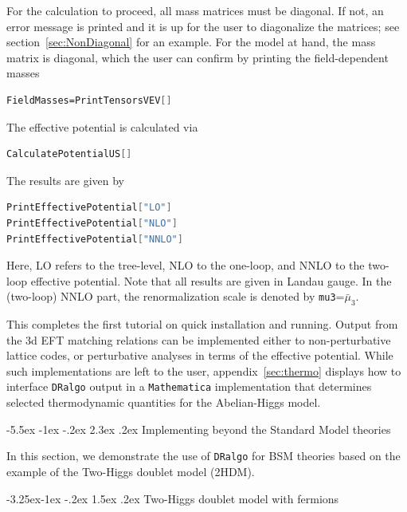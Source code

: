 \documentclass[11pt]{article}
\makeatletter
\def\dralgo{{\tt DRalgo}}
\newcommand{\Lamd}{\bmu_{3}}
\newcommand{\bmu}{\bar\mu}
\renewcommand\section{\@startsection{section}{1}{\z@}%
  {-5.5ex \@plus -1ex \@minus -.2ex}%
  {2.3ex \@plus.2ex}%
  {\normalfont\large\bfseries}}
\renewcommand\subsection{\@startsection{subsection}{2}{\z@}%
  {-3.25ex\@plus -1ex \@minus -.2ex}%
  {1.5ex \@plus .2ex}%
  {\normalfont\normalsize\bfseries}}
\makeatother
\begin{document}
For the calculation to proceed,
all mass matrices must be diagonal.
If not, an error message is printed and it is up for the user
to diagonalize the matrices;
see section~\ref{sec:NonDiagonal} for an example.
For the model at hand,
the mass matrix is diagonal,
which the user can confirm by printing the field-dependent masses
\begin{lstlisting}[language=Mathematica,mathescape=true]
FieldMasses=PrintTensorsVEV[]
\end{lstlisting}
%
The effective potential is calculated via
\begin{lstlisting}[language=Mathematica,mathescape=true]
CalculatePotentialUS[]
\end{lstlisting}
%
The results are given by
\begin{lstlisting}[language=Mathematica,mathescape=true]
PrintEffectivePotential["LO"]
PrintEffectivePotential["NLO"]
PrintEffectivePotential["NNLO"]
\end{lstlisting}
Here,
LO refers to the tree-level,
NLO to the one-loop, and
NNLO to the two-loop effective potential.
Note that all results are given in Landau gauge.
In the (two-loop) NNLO part, the renormalization scale is denoted by
{\tt mu3}=$\Lamd$.

This completes the first tutorial on quick installation and running.
Output from the 3d EFT matching relations can be implemented either to
non-perturbative lattice codes, or
perturbative analyses in terms of the effective potential.
While such implementations are left to the user,
appendix~\ref{sec:thermo} displays how to interface \dralgo{} output in
a {\tt Mathematica} implementation that determines
selected thermodynamic quantities for the Abelian-Higgs model.

%
\section{Implementing beyond the Standard Model theories}
\label{sec:BSM}

In this section,
we demonstrate the use of \dralgo{} for BSM theories based on
the example of the Two-Higgs doublet model (2HDM).

\subsection{Two-Higgs doublet model with fermions}
\label{sec:2HDM}
\end{document}
